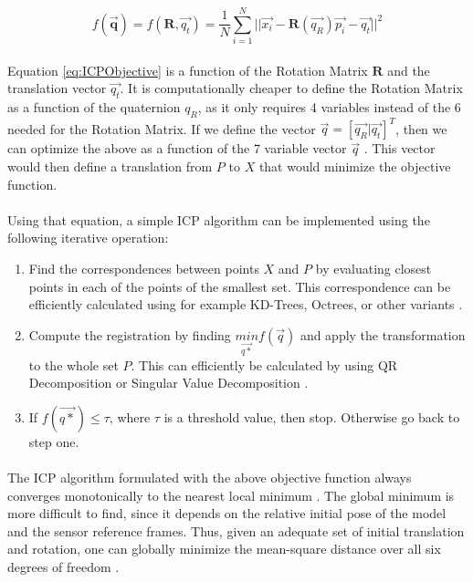 \documentclass[12pt]{article}
\begin{document}
	\begin{equation}
	f(\mathbf{\overrightarrow{q}}) = f(\mathbf{R},\overrightarrow{q_t}) = \frac{1}{N}\sum_{i=1}^{N}{||\overrightarrow{x_i}-\mathbf{R}(\overrightarrow{q_R})\overrightarrow{p_i}-\overrightarrow{q_t}||^{2}} 	
	\label{eq:ICPObjective}
	\end{equation}		
	
	\paragraph{}
	Equation \ref{eq:ICPObjective} is a function of the Rotation Matrix $\mathbf{R}$ and the translation vector $\overrightarrow{q_t}$. It is computationally cheaper to define the Rotation Matrix as a function of the quaternion $q_R$, as it only requires 4 variables instead of the 6 needed for the Rotation Matrix. If we define the vector $\overrightarrow{q} = [\overrightarrow{q_R} | \overrightarrow{q_t}]^T$, then we can optimize the above as a function of the 7 variable vector $\overrightarrow{q}$ \cite{AMethodRegistration}. This vector would then define a translation from $P$ to $X$ that would minimize the objective function.
	
	\paragraph{}
	Using that equation, a simple ICP algorithm can be implemented using the following iterative operation:
	\begin{enumerate}[leftmargin=.8in]
		\item Find the correspondences between points $X$ and $P$ by evaluating closest points in each of the points of the smallest set. This correspondence can be efficiently calculated using for example KD-Trees, Octrees, or other variants \cite{KDT}.
		\item Compute the registration by finding $\underset{\overrightarrow{q*}}{min}f(\overrightarrow{q})$ and apply the transformation to the whole set $P$. This can efficiently be calculated by using QR Decomposition or Singular Value Decomposition \cite{ICPVariants}.
		\item If $f(\overrightarrow{q*}) \leq \tau$, where $\tau$ is a threshold value, then stop. Otherwise go back to step one.
	\end{enumerate}	
	
	\paragraph{}
	The ICP algorithm formulated with the above objective function always converges monotonically to the nearest local minimum \cite{AMethodRegistration}. The global minimum is more difficult to find, since it depends on the relative initial pose of the model and the sensor reference frames. Thus, given an adequate set of initial translation and rotation, one can globally minimize the mean-square distance over all six degrees of freedom \cite{AMethodRegistration}.
\end{document}
